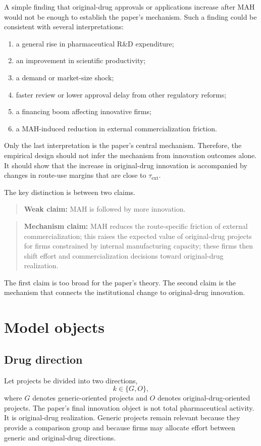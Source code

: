 \documentclass[12pt]{article}
\newcommand{\tauext}{\tau_{\mathrm{ext}}}
\begin{document}
A simple finding that original-drug approvals or applications increase after MAH would not be enough to establish the paper's mechanism. Such a finding could be consistent with several interpretations:
\begin{enumerate}
    \item a general rise in pharmaceutical R\&D expenditure;
    \item an improvement in scientific productivity;
    \item a demand or market-size shock;
    \item faster review or lower approval delay from other regulatory reforms;
    \item a financing boom affecting innovative firms;
    \item a MAH-induced reduction in external commercialization friction.
\end{enumerate}
Only the last interpretation is the paper's central mechanism. Therefore, the empirical design should not infer the mechanism from innovation outcomes alone. It should show that the increase in original-drug innovation is accompanied by changes in route-use margins that are close to $\tauext$.

The key distinction is between two claims.
\begin{quote}
\textbf{Weak claim:} MAH is followed by more innovation.
\end{quote}
\begin{quote}
\textbf{Mechanism claim:} MAH reduces the route-specific friction of external commercialization; this raises the expected value of original-drug projects for firms constrained by internal manufacturing capacity; these firms then shift effort and commercialization decisions toward original-drug realization.
\end{quote}
The first claim is too broad for the paper's theory. The second claim is the mechanism that connects the institutional change to original-drug innovation.

\section{Model objects}

\subsection{Drug direction}

Let projects be divided into two directions,
\[
k\in\{G,O\},
\]
where $G$ denotes generic-oriented projects and $O$ denotes original-drug-oriented projects. The paper's final innovation object is not total pharmaceutical activity. It is original-drug realization. Generic projects remain relevant because they provide a comparison group and because firms may allocate effort between generic and original-drug directions.
\end{document}
